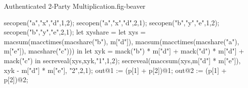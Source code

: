 \begin{fpfig}[t]{Authenticated 2-Party Multiplication.}{fig-beaver}
{\footnotesize
  \begin{verbatimtab}
    secopen("a","x","d",1,2);
    secopen("a","x","d",2,1);
    secopen("b","y","e",1,2);
    secopen("b","y","e",2,1);
    let xyshare = 
    let xys =
      macsum(macctimes(macshare("b"), m["d"]),
             macsum(macctimes(macshare("a"), m["e"]),
                    macshare("c")))
    in
    let xyk = mack("b") * m["d"] + mack("d") * m["d"] + mack("c")               
    in
    secreveal(xys,xyk,"1",1,2);
    secreveal(maccsum(xys,m["d"] * m["e"]),
              xyk - m["d"] * m["e"],
              "2",2,1);
    out@1 := (p[1] + p[2])@1;
    out@2 := (p[1] + p[2])@2;
  \end{verbatimtab}
}
\end{fpfig}
